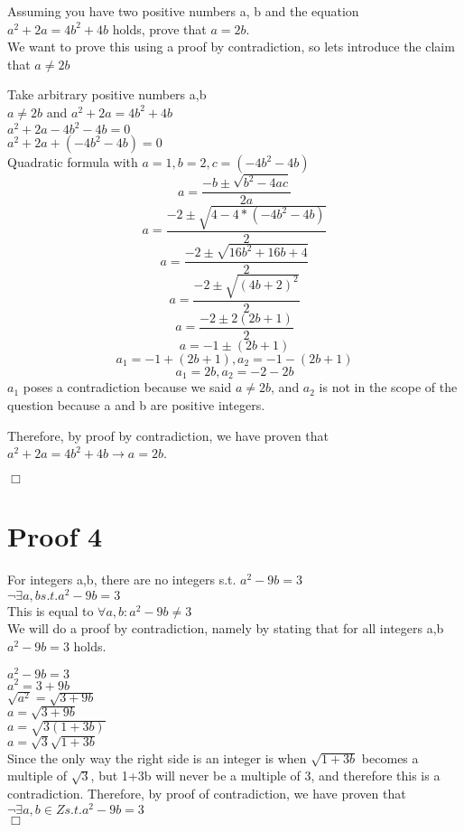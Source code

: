 \documentclass{article}
\begin{document}
Assuming you have two positive numbers a, b and the equation $a^2 + 2a = 4b^2 + 4b$ holds, prove that $a = 2b$.\\
We want to prove this using a proof by contradiction, so lets introduce the claim that $a \neq 2b$

Take arbitrary positive numbers a,b\\
$a \neq 2b$ and $a^2+2a=4b^2+4b$\\
$a^2+2a-4b^2-4b=0$\\
$a^2+2a+(-4b^2-4b)=0$\\
Quadratic formula with $a=1, b=2, c=(-4b^2-4b)$\\
$$a=\frac{-b\pm \sqrt{b^2-4ac}}{2a}$$
$$a=\frac{-2\pm \sqrt{4- 4*(-4b^2-4b)}}{2}$$
$$a=\frac{-2\pm \sqrt{16b^2+16b+4}}{2}$$
$$a=\frac{-2\pm \sqrt{(4b+2)^2}}{2}$$
$$a=\frac{-2\pm 2(2b+1)}{2}$$
$$a=-1\pm (2b+1)$$
$$a_1=-1+ (2b+1), a_2=-1-(2b+1)$$
$$a_1=2b, a_2=-2-2b$$
$a_1$ poses a contradiction because we said $a\neq 2b$, and $a_2$ is not in the scope of the question because a and b are positive integers.

Therefore, by proof by contradiction, we have proven that $a^2 + 2a = 4b^2 + 4b \rightarrow a = 2b$.

$\Box$


\section{Proof 4}
For integers a,b, there are no integers s.t. $a^2-9b=3$\\
$\neg\exists a,b s.t. a^2-9b=3$\\
This is equal to
$\forall a,b:  a^2-9b \neq 3$\\
We will do a proof by contradiction, namely by stating that for all integers a,b  $a^2-9b = 3$ holds.
 
$a^2-9b = 3$\\
$a^2 = 3+9b$\\
$\sqrt{a^2} = \sqrt{3+9b}$\\
$a = \sqrt{3+9b}$\\
$a = \sqrt{3(1+3b)}$\\
$a = \sqrt{3}\sqrt{1+3b}$\\
Since the only way the right side is an integer is when $\sqrt{1+3b}$ becomes a multiple of $\sqrt{3}$, but 1+3b will never be a multiple of 3, and therefore this is a contradiction.
Therefore, by proof of contradiction, we have proven that $\neg\exists a,b\in Z s.t. a^2-9b=3$\\ 
$\Box$
\end{document}
